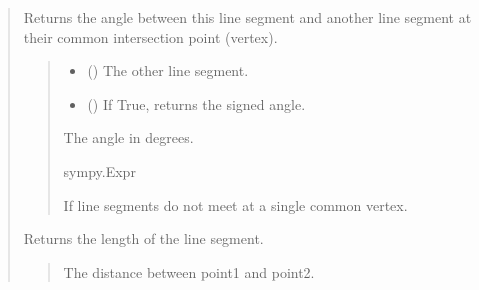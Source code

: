 \documentclass[letterpaper,10pt,english]{sphinxmanual}
\begin{document}
\begin{quote}
\begin{fulllineitems}
\begin{fulllineitems}
\label{\detokenize{pygeox:pygeox.basic_objects.LineSegment.angle}}
\pysigstartsignatures
\pysiglinewithargsret
{}
{\sphinxparamcomma {}}
{}
\pysigstopsignatures
\sphinxAtStartPar
Returns the angle between this line segment and another line segment
at their common intersection point (vertex).
\begin{quote}\begin{description}
\begin{itemize}
\item {} 
\sphinxAtStartPar
{} () \textendash{} The other line segment.

\item {} 
\sphinxAtStartPar
{} () \textendash{} If True, returns the signed angle.

\end{itemize}

\sphinxAtStartPar
The angle in degrees.

\sphinxAtStartPar
sympy.Expr

\sphinxAtStartPar
{} \textendash{} If line segments do not meet at a single common vertex.

\end{description}\end{quote}

\end{fulllineitems}


\begin{fulllineitems}
\label{\detokenize{pygeox:pygeox.basic_objects.LineSegment.length}}
\pysigstartsignatures
\pysigline
{}
\pysigstopsignatures
\sphinxAtStartPar
Returns the length of the line segment.
\begin{quote}\begin{description}
\sphinxAtStartPar
The distance between point1 and point2.


\end{description}
\end{quote}
\end{fulllineitems}
\end{fulllineitems}
\end{quote}
\end{document}
